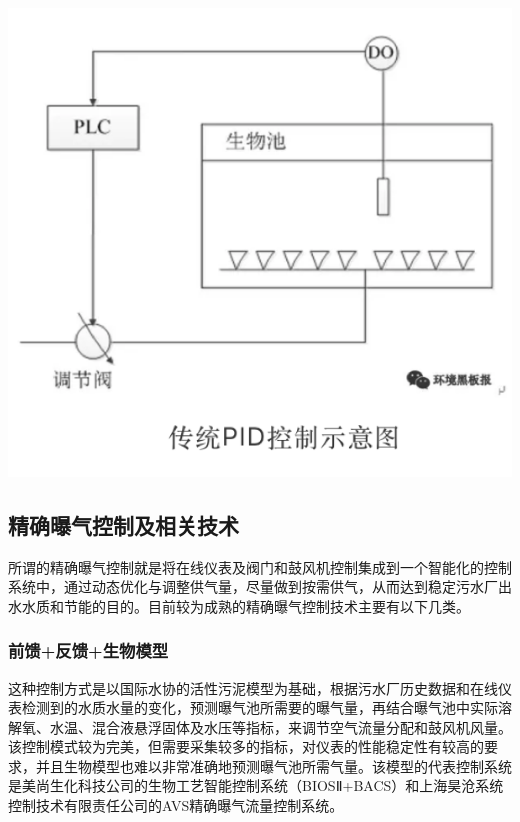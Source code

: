 \documentclass[
]{book}
\begin{document}
\includegraphics[width=8.33in]{images/bq3}

\hypertarget{ux7cbeux786eux66ddux6c14ux63a7ux5236ux53caux76f8ux5173ux6280ux672f}{%
\subsection{精确曝气控制及相关技术}\label{ux7cbeux786eux66ddux6c14ux63a7ux5236ux53caux76f8ux5173ux6280ux672f}}

所谓的精确曝气控制就是将在线仪表及阀门和鼓风机控制集成到一个智能化的控制系统中，通过动态优化与调整供气量，尽量做到按需供气，从而达到稳定污水厂出水水质和节能的目的。目前较为成熟的精确曝气控制技术主要有以下几类。

\hypertarget{ux524dux9988ux53cdux9988ux751fux7269ux6a21ux578b}{%
\subsubsection{前馈+反馈+生物模型}\label{ux524dux9988ux53cdux9988ux751fux7269ux6a21ux578b}}

这种控制方式是以国际水协的活性污泥模型为基础，根据污水厂历史数据和在线仪表检测到的水质水量的变化，预测曝气池所需要的曝气量，再结合曝气池中实际溶解氧、水温、混合液悬浮固体及水压等指标，来调节空气流量分配和鼓风机风量。该控制模式较为完美，但需要采集较多的指标，对仪表的性能稳定性有较高的要求，并且生物模型也难以非常准确地预测曝气池所需气量。该模型的代表控制系统是美尚生化科技公司的生物工艺智能控制系统（BIOSⅡ+BACS）和上海昊沧系统控制技术有限责任公司的AVS精确曝气流量控制系统。
\end{document}
